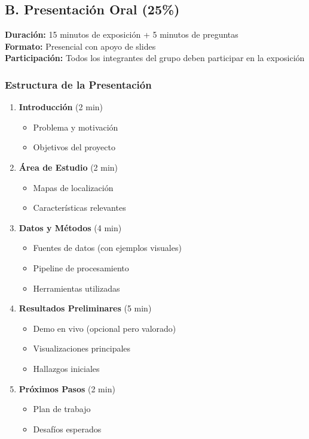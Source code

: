 \documentclass[11pt,letterpaper]{article}
\begin{document}
\subsection{B. Presentación Oral (25\%)}

\begin{deliverables}
\textbf{Duración:} 15 minutos de exposición + 5 minutos de preguntas \\
\textbf{Formato:} Presencial con apoyo de slides \\
\textbf{Participación:} Todos los integrantes del grupo deben participar en la exposición
\end{deliverables}

\subsubsection{Estructura de la Presentación}

\begin{enumerate}
    \item \textbf{Introducción} (2 min)
    \begin{itemize}
        \item Problema y motivación
        \item Objetivos del proyecto
    \end{itemize}

    \item \textbf{Área de Estudio} (2 min)
    \begin{itemize}
        \item Mapas de localización
        \item Características relevantes
    \end{itemize}

    \item \textbf{Datos y Métodos} (4 min)
    \begin{itemize}
        \item Fuentes de datos (con ejemplos visuales)
        \item Pipeline de procesamiento
        \item Herramientas utilizadas
    \end{itemize}

    \item \textbf{Resultados Preliminares} (5 min)
    \begin{itemize}
        \item Demo en vivo (opcional pero valorado)
        \item Visualizaciones principales
        \item Hallazgos iniciales
    \end{itemize}

    \item \textbf{Próximos Pasos} (2 min)
    \begin{itemize}
        \item Plan de trabajo
        \item Desafíos esperados
    \end{itemize}
\end{enumerate}
\end{document}

